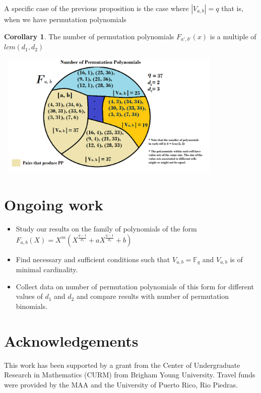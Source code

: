 \documentclass{article}
\theoremstyle{definition}
\newtheorem{corollary}[theorem]{Corollary}
\theoremstyle{remark}
\numberwithin{equation}{section}
\begin{document}
A specific case of the previous proposition is the case where $|V_{a, b}| = q$ that is, when we have permutation polynomials

\begin{corollary}
  The number of permutation polynomials $F_{a', b'}(x)$ is a multiple of $lcm(d_1,d_2)$  
\end{corollary}

\vspace{0.7em}
\includegraphics[width=11cm, height=6cm]{clases}
\vspace{0.3em}

\section{Ongoing work}    

    \begin{itemize}
    \item Study our results on the family of polynomials of the form $F_{a,b}(X) = X^m(X^{\frac{q-1}{d_1}} + aX^{\frac{q-1}{d_2}} +b)$
    \item Find necessary and sufficient conditions such that $V_{a,b} = \mathbb{F}_q$ and $V_{a,b}$ is of minimal cardinality.
    \item Collect data on number of permutation polynomials of this form for different values of $d_1$ and $d_2$ and compare results with number of permutation binomials.
  \end{itemize}

\section{Acknowledgements}

  This work has been supported by a grant from the Center of Undergraduate Research in Mathematics (CURM) from Brigham Young University. Travel funds were provided by the MAA and the University of Puerto Rico, Rio Piedras.
 
\end{document}
